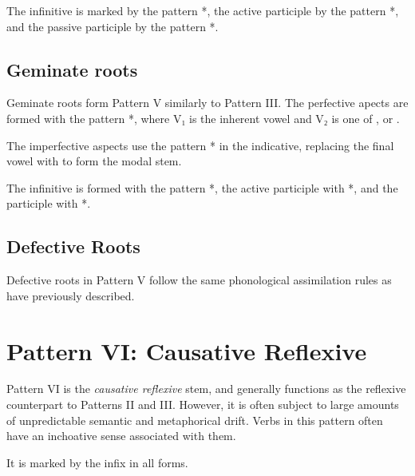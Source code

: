 \documentclass[grammar]{subfiles}
\begin{document}
The infinitive is marked by the pattern *, the active participle
by the pattern *, and the passive participle by the pattern
*.  


\subsection{Geminate roots}
\label{ssec:vm_v_geminate_roots}

Geminate roots form Pattern V similarly to Pattern III.   The perfective apects are formed with the pattern
*, where V₁ is the inherent vowel and V₂ is one of ,
 or .

The imperfective aspects use the pattern * in the indicative,
replacing the final vowel with  to form the modal stem. 

The infinitive is formed with the pattern *, the active participle
with *, and the participle with *.  


\subsection{Defective Roots}
\label{ssec:vm_v_defective_roots}

Defective roots in Pattern V follow the same phonological assimilation rules
as have previously described. 


\section{Pattern VI: Causative Reflexive}
\label{sec:vm_pattern_vi}

Pattern VI is the \emph{causative reflexive} stem, and generally functions as the
reflexive counterpart to Patterns II and III.  However, it is often subject to
large amounts of unpredictable semantic and metaphorical drift.  Verbs in this
pattern often have an inchoative sense associated with them. 

It is marked by the infix  in all forms. 

\end{document}
